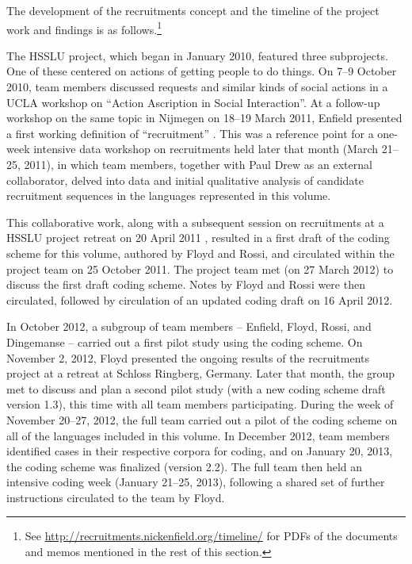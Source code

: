 \documentclass[output=paper,modfonts,nonflat]{langsci/langscibook}
\begin{document}
The development of the recruitments concept and the timeline of the project work and findings is as follows.\footnote{See \url{http://recruitments.nickenfield.org/timeline/} for PDFs of the documents and memos mentioned in the rest of this section.\label{fn:intro:2}}

The HSSLU project, which began in January 2010, featured three subprojects. One of these centered on actions of getting people to do things. On 7--9 October 2010, team members discussed requests and similar kinds of social actions in a UCLA workshop on “Action Ascription in Social Interaction”. At a follow-up workshop on the same topic in Nijmegen on 18--19 March 2011, Enfield presented a first working definition of “recruitment” \citep{Enfield2011a}. This was a reference point for a one-week intensive data workshop on recruitments held later that month (March 21--25, 2011), in which team members, together with Paul Drew as an external collaborator, delved into data and initial qualitative analysis of candidate recruitment sequences in the languages represented in this volume.

This collaborative work, along with a subsequent session on recruitments at a HSSLU project retreat on 20 April 2011 \citep{Enfield2011b}, resulted in a first draft of the coding scheme for this volume, authored by Floyd and Rossi, and circulated within the project team on 25 October 2011. The project team met (on 27 March 2012) to discuss the first draft coding scheme. Notes by Floyd and Rossi were then circulated, followed by circulation of an updated coding draft on 16 April 2012.

In October 2012, a subgroup of team members -- Enfield, Floyd, Rossi, and Dingemanse -- carried out a first pilot study using the coding scheme. On November 2, 2012, Floyd presented the ongoing results of the recruitments project at a retreat at Schloss Ringberg, Germany. Later that month, the group met to discuss and plan a second pilot study (with a new coding scheme draft version 1.3), this time with all team members participating. During the week of November 20--27, 2012, the full team carried out a pilot of the coding scheme on all of the languages included in this volume. In December 2012, team members identified cases in their respective corpora for coding, and on January 20, 2013, the coding scheme was finalized (version 2.2). The full team then held an intensive coding week (January 21--25, 2013), following a shared set of further instructions circulated to the team by Floyd.
\end{document}
